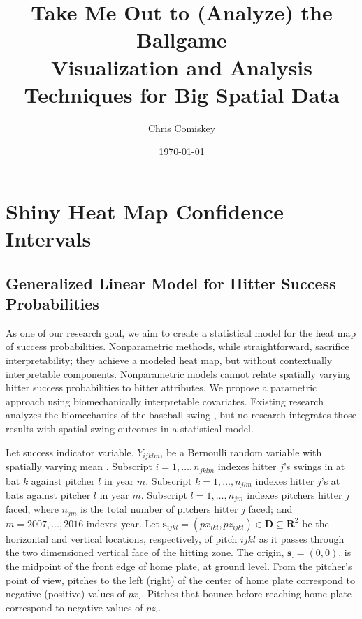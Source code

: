 \documentclass{article}
\title{Take Me Out to (Analyze) the Ballgame \\ Visualization and Analysis Techniques for Big Spatial Data}
\author{Chris Comiskey}
\date{\today}
\begin{document}
\maketitle{}

\tableofcontents

\section{Shiny Heat Map Confidence Intervals}


\subsection{Generalized Linear Model for Hitter Success Probabilities} %

As one of our research goal, we aim to create a statistical model for the heat map of success probabilities. Nonparametric methods, while straightforward, sacrifice interpretability; they achieve a modeled heat map, but without contextually interpretable components. Nonparametric models cannot relate spatially varying hitter success probabilities to hitter attributes. We propose a parametric approach using biomechanically interpretable covariates. Existing research analyzes the biomechanics of the baseball swing \citep{Welch1995}, but no research integrates those results with spatial swing outcomes in a statistical model.

Let success indicator variable, $Y_{ijklm}$, be a Bernoulli random variable with spatially varying mean \citep{Ross2002}. Subscript $i = 1, \dots, n_{jklm}$ indexes hitter $j$'s swings in at bat $k$ against pitcher $l$ in year $m$. Subscript $k = 1, \dots, n_{jlm}$ indexes hitter $j$'s at bats against pitcher $l$ in year $m$. Subscript $l = 1, \dots, n_{jm}$ indexes pitchers hitter $j$ faced, where $n_{jm}$ is the total number of pitchers hitter $j$ faced; and $m = 2007, \dots, 2016$ indexes year. Let $\pmb{s}_{ijkl} = (px_{ikl}, pz_{ijkl})\in \pmb{D} \subseteq \pmb{R}^{2}$ be the horizontal and vertical locations, respectively, of pitch $ijkl$ as it passes through the two dimensioned vertical face of the hitting zone. The origin, $\pmb{s}_{\cdot} = (0,0)$, is the midpoint of the front edge of home plate, at ground level. From the pitcher's point of view, pitches to the left (right) of the center of home plate correspond to negative (positive) values of $px_{\cdot}$. Pitches that bounce before reaching home plate correspond to negative values of $pz_{\cdot}$.  
\end{document}
